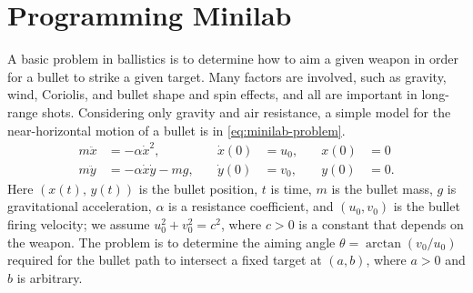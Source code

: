 \documentclass[12pt,twoside]{article}
\begin{document}
\section{Programming Minilab}
A basic problem in ballistics is to determine how to aim a given weapon in order
for a bullet to strike a given target. Many factors are involved, such as
gravity, wind, Coriolis, and bullet shape and spin effects, and all are
important in long-range shots. Considering only gravity and air resistance, a
simple model for the near-horizontal motion of a bullet is in
\cref{eq:minilab-problem}.
\begin{equation}
  \label{eq:minilab-problem}
  \begin{aligned}
    m\ddot{x}&=-\alpha\dot{x}^2, &\quad \dot{x}(0)&=u_0, &\quad x(0)&=0 \\
    m\ddot{y}&=-\alpha\dot{x}\dot{y}-mg, &\quad \dot{y}(0)&=v_0, &\quad y(0)&=0.
  \end{aligned}
\end{equation}
Here $(x(t),\,y(t))$ is the bullet position, $t$ is time, $m$ is the bullet
mass, $g$ is gravitational acceleration, $\alpha$ is a resistance coefficient,
and $(u_0,v_0)$ is the bullet firing velocity; we assume $u_0^2+v_0^2=c^2$,
where $c>0$ is a constant that depends on the weapon. The problem is to
determine the aiming angle $\theta = \arctan(v_0/u_0)$ required for the bullet
path to intersect a fixed target at $(a,b)$, where $a>0$ and $b$ is arbitrary.
\end{document}

